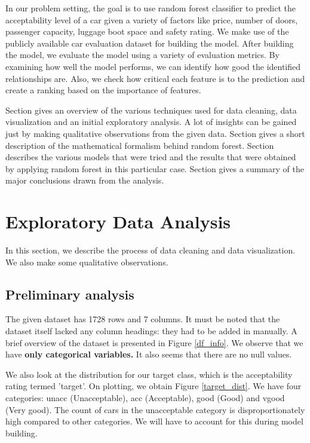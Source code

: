 \documentclass[conference]{IEEEtran}
\newcommand{\rom}[1]{\uppercase\expandafter{\romannumeral #1\relax}}
\begin{document}
In our problem setting, the goal is to use random forest classifier to predict the acceptability level of a car given a variety of factors like price, number of doors, passenger capacity, luggage boot space and safety rating. We make use of the publicly available car evaluation dataset for building the model. After building the model, we evaluate the model using a variety of evaluation metrics. By examining how well the model performs, we can identify how good the identified relationships are. Also, we check how critical each feature is to the prediction and create a ranking based on the importance of features.


Section \rom{2} gives an overview of the various techniques used for data cleaning, data visualization and an initial exploratory analysis. A lot of insights can be gained just by making qualitative observations from the given data. Section \rom{3} gives a short description of the mathematical formalism behind random forest. Section \rom{4} describes the various models that were tried and the results that were obtained by applying random forest in this particular case. Section \rom{5} gives a summary of the major conclusions drawn from the analysis.


\section{Exploratory Data Analysis}

In this section, we describe the process of data cleaning and data visualization. We also make some qualitative observations.

\subsection{Preliminary analysis}

The given dataset has 1728 rows and 7 columns. It must be noted that the dataset itself lacked any column headings: they had to be added in manually. A brief overview of the dataset is presented in Figure \ref{df_info}. We observe that we have \textbf{only categorical variables.} It also seems that there are no null values. 

We also look at the distribution for our target class, which is the acceptability rating termed 'target'. On plotting, we obtain Figure \ref{target_dist}. We have four categories: unacc (Unacceptable), acc (Acceptable), good (Good) and vgood (Very good). The count of cars in the unacceptable category is disproportionately high compared to other categories. We will have to account for this during model building.
\end{document}
